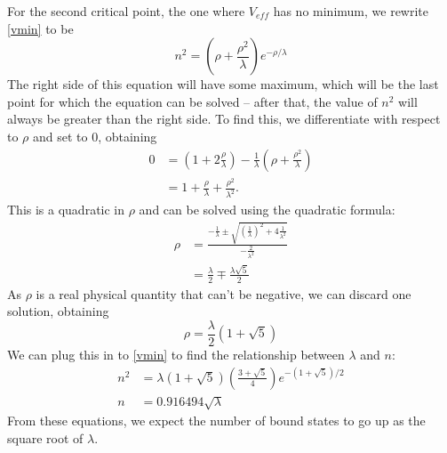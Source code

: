\documentclass[12pt,twoside]{reedthesis}
\begin{document}
For the second critical point, the one where $V_{eff}$ has no minimum, we rewrite \eqref{vmin} to be
\begin{equation}
n^2 = \left( \rho + \frac{\rho^2}{\lambda} \right) e^{-\rho/\lambda}
\end{equation}
The right side of this equation will have some maximum, which will be the last point for which the equation can be solved -- after that, the value of $n^2$ will always be greater than the right side. To find this, we differentiate with respect to $\rho$ and set to 0, obtaining
\begin{align}
0 &= (1+2 \frac{\rho}{\lambda}) - \frac{1}{\lambda}(\rho + \frac{\rho^2}{\lambda}) \\
&= 1 + \frac{\rho}{\lambda} + \frac{\rho^2}{\lambda^2}\mbox{.}
\end{align}
This is a quadratic in $\rho$ and can be solved using the quadratic formula:
\begin{align}
\rho &= \frac{-\frac{1}{\lambda} \pm \sqrt{\left(\frac{1}{\lambda}\right)^2+4\frac{1}{\lambda^2}}}{-\frac{2}{\lambda^2}} \\
&= \frac{\lambda}{2} \mp \frac{\lambda \sqrt{5}}{2}
\end{align}
As $\rho$ is a real physical quantity that can't be negative, we can discard one solution, obtaining
\begin{equation}
\rho = \frac{\lambda}{2}(1+\sqrt{5})
\end{equation}
We can plug this in to \eqref{vmin} to find the relationship between $\lambda$ and $n$:
\begin{align}
n^2 &= \lambda(1+\sqrt{5})\left(\frac{3+\sqrt{5}}{4}\right)e^{-(1+\sqrt{5})/2} \\
n &= 0.916494 \sqrt{\lambda}
\end{align}
From these equations, we expect the number of bound states to go up as the square root of $\lambda$.
\end{document}
